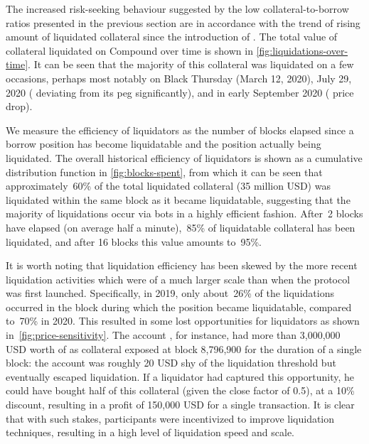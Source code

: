The increased risk-seeking behaviour suggested by the low collateral-to-borrow ratios presented in the previous section are in accordance with the trend of rising amount of liquidated collateral since the introduction of .  
The total value of collateral liquidated on Compound over time is shown in \autoref{fig:liquidations-over-time}.
It can be seen that the majority of this collateral was liquidated on a few occasions, perhaps most notably on Black Thursday (March 12, 2020), July 29, 2020 ( deviating from its peg significantly), and in early September 2020 ( price drop).

We measure the efficiency of liquidators as the number of blocks elapsed since a borrow position has become liquidatable and the position actually being liquidated.
The overall historical efficiency of liquidators is shown as a cumulative distribution function in \autoref{fig:blocks-spent}, from which it can be seen that approximately~60\% of the total liquidated collateral (35 million USD) was liquidated within the same block as it became liquidatable, suggesting that the majority of liquidations occur via bots in a highly efficient fashion.
After~2 blocks have elapsed (on average half a minute),~85\% of liquidatable collateral has been liquidated, and after 16 blocks this value amounts to~95\%.

It is worth noting that liquidation efficiency has been skewed by the more recent liquidation activities which were of a much larger scale than when the protocol was first launched.
Specifically, in 2019, only about~26\% of the liquidations occurred in the block during which the position became liquidatable, compared to~70\% in 2020.
This resulted in some lost opportunities for liquidators as shown in~\autoref{fig:price-sensitivity}.
The account , for instance, had more than 3,000,000 USD worth of  as collateral exposed at block 8,796,900 for the duration of a single block: the account was roughly 20 USD shy of the liquidation threshold but eventually escaped liquidation.
If a liquidator had captured this opportunity, he could have bought half of this collateral (given the close factor of 0.5), at a 10\% discount, resulting in a profit of 150,000 USD for a single transaction.
It is clear that with such stakes, participants were incentivized to improve liquidation techniques, resulting in a high level of liquidation speed and scale.

